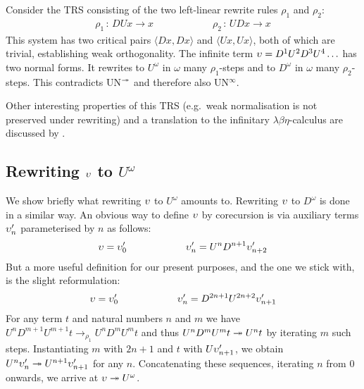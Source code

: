 Consider the TRS consisting of the two left-linear rewrite rules
$\rho_1$ and $\rho_2$:
\begin{align*}
  \rho_1 \, : \, DUx \to x \qquad \qquad \qquad
  \rho_2 \, : \, UDx \to x
\end{align*}
This system has two critical pairs $\langle Dx, Dx \rangle$ and
$\langle Ux, Ux \rangle$, both of which are trivial, establishing
weak orthogonality. The infinite term $\upsilon = D^1 U^2 D^3 U^4 \ldots$
has two normal forms. It rewrites to $U^\omega$ in $\omega$ many
$\rho_1$-steps and to $D^\omega$ in $\omega$ many $\rho_2$-steps.
This contradicts UN$^{\twoheadrightarrow}$ and therefore also UN$^\infty$.

Other interesting properties of this TRS (e.g.\ weak normalisation is
not preserved under rewriting) and a translation to the infinitary
$\lambda \beta \eta$-calculus are discussed by \citet{endrullis-10}.


\subsection{\texorpdfstring{Rewriting $\upsilon$ to
    $U^\omega$}{Rewriting DUUDDD... to
    UUU...}}\label{sub:counterexample}

We show briefly what rewriting $\upsilon$ to $U^\omega$ amounts
to. Rewriting $\upsilon$ to $D^\omega$ is done in a similar way.
An obvious way to define $\upsilon$ by corecursion is via auxiliary terms
$\upsilon'_n$ parameterised by $n$ as follows:
\begin{align*}
  \upsilon = \upsilon'_0 \qquad \qquad \qquad
  \upsilon'_n = U^n D^{n + 1} \upsilon'_{n + 2}
\end{align*}
But a more useful definition for our present purposes, and the one we
stick with, is the slight reformulation: %
\begin{align*}
  \upsilon = \upsilon'_0 \qquad \qquad \qquad
  \upsilon'_n = D^{2 n + 1} U^{2 n + 2} \upsilon'_{n + 1}
\end{align*}
For any term $t$ and natural numbers $n$ and $m$ we have $U^n D^{m+1}
U^{m+1} t \rightarrow_{\rho_1} U^n D^m U^m t$ and thus $U^n D^m U^m t
\twoheadrightarrow U^n t$ by iterating $m$ such steps. Instantiating
$m$ with $2 n + 1$ and $t$ with $U \upsilon'_{n + 1}$, we obtain
$U^n \upsilon'_n \twoheadrightarrow U^{n+1} \upsilon'_{n + 1}$ for any $n$.
Concatenating these sequences, iterating $n$ from $0$ onwards, we
arrive at $\upsilon \twoheadrightarrow U^\omega$.


